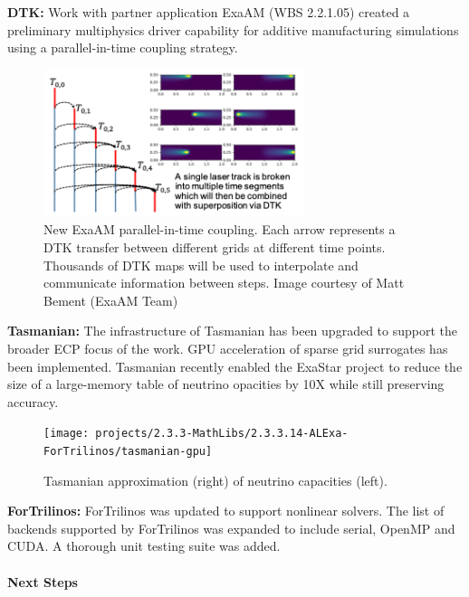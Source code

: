 {\bf DTK:} Work with partner application ExaAM (WBS 2.2.1.05) created a
preliminary multiphysics driver capability for additive manufacturing
simulations using a parallel-in-time coupling strategy.

\begin{figure}[htb]
        \centering \includegraphics[width=3.0in]{projects/2.3.3-MathLibs/2.3.3.14-ALExa-ForTrilinos/dtk_exaam_pit.png} \caption{\label{fig:dtk-exaam-pit}
        New ExaAM parallel-in-time coupling. Each arrow represents a DTK
        transfer between different grids at different time points. Thousands
        of DTK maps will be used to interpolate and communicate information
        between steps. Image courtesy of Matt Bement (ExaAM Team) }
\end{figure}

{\bf Tasmanian:} The infrastructure of Tasmanian has been upgraded to support
the broader ECP focus of the work.  GPU acceleration of sparse grid surrogates
has been implemented.  Tasmanian recently enabled the ExaStar project to
reduce the size of a large-memory table of neutrino opacities by 10X while
still preserving accuracy.

\begin{figure}[htb]
        \centering
        \texttt{[image: projects/2.3.3-MathLibs/2.3.3.14-ALExa-ForTrilinos/tasmanian-gpu]}
        \caption{\label{fig:tasmanian-gpu}Tasmanian approximation (right) of neutrino capacities (left).}
\end{figure}

{\bf ForTrilinos:} ForTrilinos was updated to support nonlinear solvers. The
list of backends supported by ForTrilinos was expanded to include serial,
OpenMP and CUDA. A thorough unit testing suite was added.


\paragraph{Next Steps}

\indent

